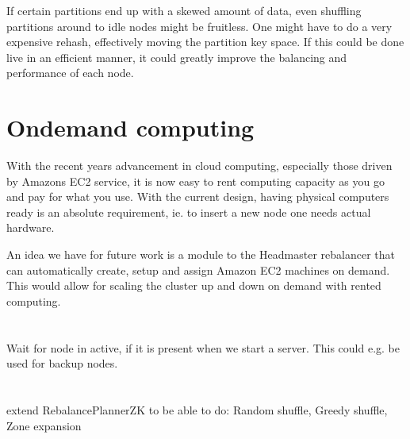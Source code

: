 If certain partitions end up with a skewed amount of data, even shuffling partitions around to idle nodes might be fruitless. One might have to do a very expensive rehash, effectively moving the partition key space. If this could be done live in an efficient manner, it could greatly improve the balancing and performance of each node.

\section{Ondemand computing}
With the recent years advancement in cloud computing, especially those driven by Amazons EC2 service, it is now easy to rent computing capacity as you go and pay for what you use.
With the current design, having physical computers ready is an absolute requirement, ie. to insert a new node one needs actual hardware.

An idea we have for future work is a module to the Headmaster rebalancer that can automatically create, setup and assign Amazon EC2 machines on demand. This would allow for scaling the cluster up and down on demand with rented computing.


\section{}
Wait for node in active, if it is present when we start a server. This could e.g. be used for backup nodes.

\section{}
extend RebalancePlannerZK to be able to do: Random shuffle, Greedy shuffle, Zone expansion

